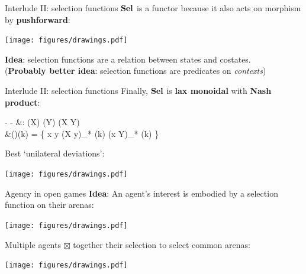 \begin{frame}{Interlude II: selection functions}
	$\mathbf{Sel}$ is a functor because it also acts on morphism by \textbf{pushforward}:

	\begin{center}
		\texttt{[image: figures/drawings.pdf]}
	\end{center}

	\textbf{Idea}: selection functions are a relation between states and costates.\\
	({\color{colornote}\textbf{Probably better idea}: selection functions are predicates on \emph{contexts}})
\end{frame}

\begin{frame}{Interlude II: selection functions}
	Finally, $\mathbf{Sel}$ is \textbf{lax monoidal} with \textbf{Nash product}:

	\begin{eqalign*}
		- \boxtimes - &: \Sel(X) \times \Sel(Y) \to \Sel(X \otimes Y)\\
		&(\varepsilon \boxtimes \eta)(k) = \{ x \otimes y \in (X \otimes y)_* \varepsilon(k) \cap (x \otimes Y)_* \eta(k) \}
	\end{eqalign*}

	Best `unilateral deviations':

	\begin{center}
		\texttt{[image: figures/drawings.pdf]}
	\end{center}
\end{frame}

\begin{frame}{Agency in open games}
	\textbf{Idea}: An agent's interest is embodied by a selection function on their arenas:

	\vspace{-3ex}
	\begin{center}
		\texttt{[image: figures/drawings.pdf]}
	\end{center}

	Multiple agents $\boxtimes$ together their selection to select common arenas:

	\begin{center}
		\texttt{[image: figures/drawings.pdf]}
	\end{center}
\end{frame}

